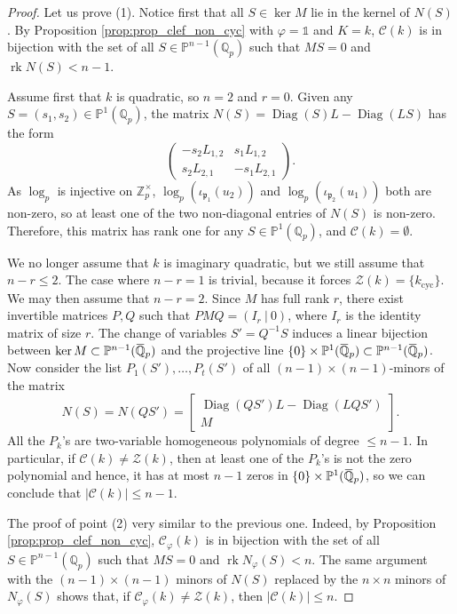 \documentclass[10pt,a4paper]{amsart}
\DeclareMathOperator{\Diag}{Diag}
\newcommand{\Q}{\mathbb{Q}}
\newcommand\Qp{{\mathbb{Q}_p}}
\newcommand{\Z}{\mathbb{Z}}
\newcommand\bP{\mathbb{P}}
\newcommand{\cyc}{\textrm{cyc}}
\newcommand\gp{\mathfrak{p}}
\newcommand{\ob}[1]{\mkern 1.5mu\overline{\mkern-1.5mu#1\mkern-1.5mu}\mkern 1.5mu}
\DeclareMathOperator{\rk}{rk}
\newcommand\sC{\mathscr{C}}
\newcommand\sZ{\mathscr{Z}}
\begin{document}
	\begin{proof}
		Let us prove (1). Notice first that all $S\in \ker M$ lie in the kernel of $N(S)$. By Proposition \ref{prop:prop_clef_non_cyc} with $\varphi=\mathds{1}$ and $K=k$, $\sC(k)$ is in bijection with the set of all $S\in \bP^{n-1}(\Qp)$ such that $MS=0$ and $\rk N(S)<n-1$.
		
		Assume first that $k$ is quadratic, so $n=2$ and $r=0$. Given any $S=(s_1,s_2)\in \bP^1(\Qp)$, the matrix $N(S)=\Diag(S)L - \Diag(LS)$ has the form 
		\[\begin{pmatrix}
			-s_2L_{1,2} & s_1 L_{1,2} \\ s_2 L_{2,1} & -s_1 L_{2,1}
		\end{pmatrix}.\]
		As $\log_p$ is injective on $\Z_p^\times$, $\log_p(\iota_{\gp_1}(u_2))$ and $\log_p(\iota_{\gp_2}(u_1))$ both are non-zero, so at least one of the two non-diagonal entries of $N(S)$ is non-zero. Therefore, this matrix has rank one for any $S\in \bP^1(\Qp)$, and $\sC(k)=\emptyset$.
		
		We no longer assume that $k$ is imaginary quadratic, but we still assume that $n-r\leq 2$. The case where $n-r=1$ is trivial, because it forces $\sZ(k)=\{k_{\cyc}\}$. We may then assume that $n-r=2$. Since $M$ has full rank $r$, there exist invertible matrices $P,Q$ such that $PMQ=\left( I_r\ | \ 0\right)$, where $I_r$ is the identity matrix of size $r$. The change of variables $S'=Q^{-1}S$ induces a linear bijection between $\ker M \subset \bP^{n-1}(\ob{\Q}_p)$ and the projective line $\{0\} \times \bP^{1}(\ob{\Q}_p) \subset \bP^{n-1}(\ob{\Q}_p)$. Now consider the list $P_1(S'),\ldots,P_t(S')$ of all $(n-1)\times(n-1)$-minors of the matrix	
		\[N(S)=N(QS')=\begin{bmatrix}
			\Diag(QS')L- \Diag(LQS')\\
			M
		\end{bmatrix}.\]
		All the $P_k$'s are two-variable homogeneous polynomials of degree $\leq n-1$. In particular, if $\sC(k)\neq \sZ(k)$, then at least one of the $P_k$'s is not the zero polynomial and hence, it has at most $n-1$ zeros in $\{0\} \times \bP^{1}(\ob{\Q}_p)$, so we can conclude that $|\sC(k)|\leq n-1$.
		
		The proof of point (2) very similar to the previous one. Indeed, by Proposition \ref{prop:prop_clef_non_cyc}, $\sC_\varphi(k)$ is in bijection with the set of all $S\in \bP^{n-1}(\Qp)$ such that $MS=0$ and $\rk N_\varphi(S)<n$. The same argument with the $(n-1)\times(n-1)$ minors of $N(S)$ replaced by the $n\times n$ minors of $N_\varphi(S)$ shows that, if $\sC_\varphi(k)\neq \sZ(k)$, then $|\sC(k)|\leq n$.
	\end{proof}
\end{document}
